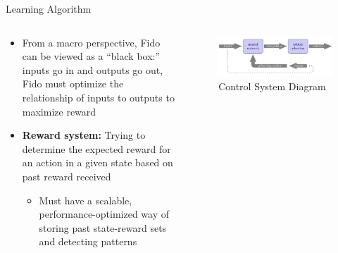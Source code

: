 \documentclass[final]{beamer}
\newlength{\onecolwid}
\newlength{\twocolwid}
\begin{document}
\begin{frame}[t]
\begin{columns}[t]
\begin{column}{\twocolwid}
	\begin{block}{Learning Algorithm}
		\begin{columns}[t,totalwidth=\twocolwid]
			\begin{column}{\onecolwid}
				\begin{itemize}
					\item From a macro perspective, Fido can be viewed as a ``black box:'' inputs go in and outputs go out, Fido must optimize the relationship of inputs to outputs to maximize reward
					\item  \textbf{Reward system:} Trying to determine the expected reward for an action in a given state based on past reward received
					\begin{itemize}
						\item Must have a scalable, performance-optimized way of storing past state-reward sets and detecting patterns
					\end{itemize}
				\end{itemize}
			\end{column}
			\begin{column}{\onecolwid}
				\vspace{1cm}
				\begin{figure}
					\centering
					\includegraphics[width=\linewidth]{Figures/diagramRendered.png}
					\caption{Control System Diagram}
				\end{figure}
			\end{column}
		\end{columns}
	\end{block}

\begin{columns}[t,totalwidth=\twocolwid]


\end{columns}
\end{column}
\end{columns}
\end{frame}
\end{document}
